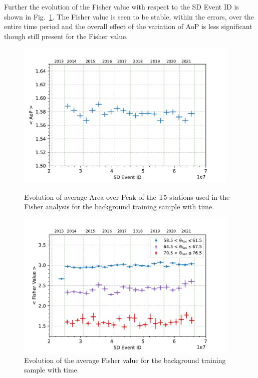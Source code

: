 Further the evolution of the Fisher value with respect to the SD Event ID is shown in Fig.~\ref{fig:Fisher_evol}. The Fisher value is seen to be stable, within the errors, over the entire time period and the overall effect of the variation of AoP is less significant though still present for the Fisher value.


\FloatBarrier

\begin{figure}[ht!]
  \centering
  \includegraphics[width=0.95\textwidth]{thesis_figures/Nu_analysis/Time_evol/Selection_Evo_AoP_wnt_redcut.pdf}
  \caption{Evolution of average Area over Peak of the T5 stations used in the Fisher analysis for the background training sample with time.}
  \label{fig:AoP_evol}
  \includegraphics[width=0.95\textwidth]{thesis_figures/Nu_analysis/Time_evol/Selection_Evo_FishVal_bkg_wnt_redcut.pdf}
  \caption{Evolution of the average Fisher value for the background training sample with time.}
  \label{fig:Fisher_evol}
\end{figure}
\FloatBarrier


